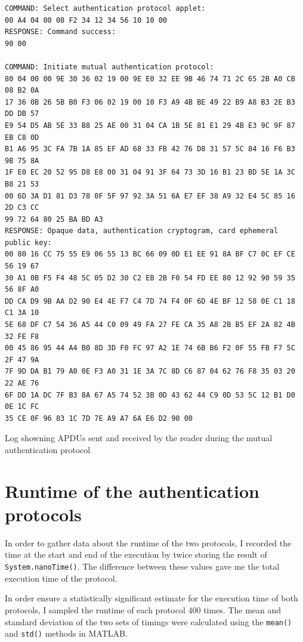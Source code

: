 \documentclass[12pt,a4paper,twoside,openright]{report}
\begin{document}
\begin{listing}
\begin{verbatim}
COMMAND: Select authentication protocol applet:
00 A4 04 00 08 F2 34 12 34 56 10 10 00
RESPONSE: Command success:
90 00

COMMAND: Initiate mutual authentication protocol:
80 04 00 00 9E 30 36 02 19 00 9E E0 32 EE 9B 46 74 71 2C 65 2B A0 CB 08 B2 0A
17 36 0B 26 5B B0 F3 06 02 19 00 10 F3 A9 4B BE 49 22 B9 A8 B3 2E B3 DD DB 57
E9 54 D5 AB 5E 33 B8 25 AE 00 31 04 CA 1B 5E 81 E1 29 4B E3 9C 9F 87 EB C8 0D
B1 A6 95 3C FA 7B 1A 85 EF AD 68 33 FB 42 76 D8 31 57 5C 84 16 F6 B3 9B 75 8A
1F E0 EC 20 52 95 D8 E8 00 31 04 91 3F 64 73 3D 16 B1 23 BD 5E 1A 3C B8 21 53
00 6D 3A D1 81 D3 78 0F 5F 97 92 3A 51 6A E7 EF 38 A9 32 E4 5C 85 16 2D C3 CC
99 72 64 80 25 BA BD A3
RESPONSE: Opaque data, authentication cryptogram, card ephemeral public key:
00 80 16 CC 75 55 E9 06 55 13 BC 66 09 0D E1 EE 91 8A BF C7 0C EF CE 56 19 67
30 A1 0B F5 F4 48 5C 05 D2 30 C2 EB 2B F0 54 FD EE 80 12 92 90 59 35 56 8F A0
DD CA D9 9B AA D2 90 E4 4E F7 C4 7D 74 F4 0F 6D 4E BF 12 58 0E C1 18 C1 3A 10
5E 68 DF C7 54 36 A5 44 C0 09 49 FA 27 FE CA 35 A8 2B B5 EF 2A 82 4B 32 FE F8
00 45 86 95 44 A4 B0 8D 3D F0 FC 97 A2 1E 74 6B B6 F2 0F 55 FB F7 5C 2F 47 9A
7F 9D DA B1 79 A0 0E F3 A0 31 1E 3A 7C 8D C6 87 04 62 76 F8 35 03 20 22 AE 76
6F DD 1A DC 7F B3 8A 67 A5 74 52 3B 0D 43 62 44 C9 0D 53 5C 12 B1 D0 0E 1C FC
35 CE 0F 96 83 1C 7D 7E A9 A7 6A E6 D2 90 00
\end{verbatim}
\caption{Log showning APDUs sent and received by the reader during the mutual authentication protocol}
\label{mutualauthlog}
\end{listing}

\section{Runtime of the authentication protocols}

In order to gather data about the runtime of the two protocols, I recorded the time at the start and end of the execution by twice storing the result of \texttt{System.nanoTime()}. The difference between these values gave me the total execution time of the protocol.

In order ensure a statistically significant estimate for the execution time of both protocols, I sampled the runtime of each protocol 400 times. The mean and standard deviation of the two sets of timings were calculated using the \texttt{mean()} and \texttt{std()} methods in MATLAB.
\end{document}
